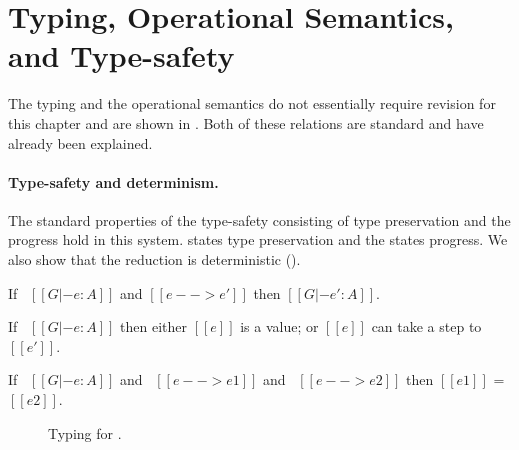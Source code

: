 

\section{Typing, Operational Semantics, and Type-safety}

The typing and the operational semantics do not essentially
require revision for this chapter and are shown in .
Both of these relations are standard and have already been
explained.

\paragraph{Type-safety and determinism.}
The standard properties of the type-safety consisting
of type preservation and the progress hold in this system.
 states type preservation 
and the  states progress.
We also show that the reduction is deterministic
().

\begin{theorem}
\label{lemma:cost:preservation}
  If \ $[[G |- e : A]]$ and $[[e --> e']]$ then $[[G |- e' : A]]$.
\end{theorem}

\begin{theorem}[Progress]
\label{lemma:cost:progress}
If \ $[[G |- e : A]]$ then either $[[e]]$ is a value;
or $[[e]]$ can take a step to $[[e']]$.
\end{theorem}

\begin{theorem}[Determinism]
\label{lemma:cost:determinism}
  If \ $[[G |- e : A]]$ and \ $[[e --> e1]]$ and \ $[[e --> e2]]$ then $[[e1]]$ = $[[e2]]$.
\end{theorem}

\begin{figure}[t]
    \begin{small}
    \centering
  \end{small}
  \caption{Typing for \name.}
  \label{fig:cost:typ}
\end{figure}